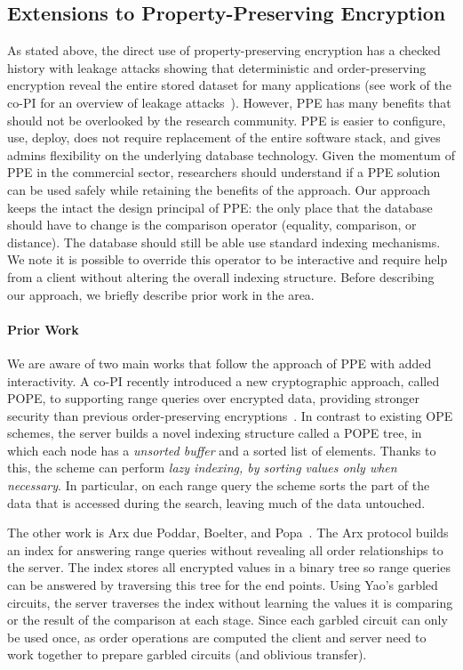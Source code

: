 
\subsection{Extensions to Property-Preserving Encryption}
As stated above, the direct use of property-preserving encryption has a checked history with leakage attacks showing that deterministic and order-preserving encryption reveal the entire stored dataset for many applications (see work of the co-PI for an overview of leakage attacks~\cite{SP:FVYSHG17}).  However, PPE has many benefits that should not be overlooked by the research community.  PPE is easier to configure, use, deploy, does not require replacement of the entire software stack, and gives admins flexibility on the underlying database technology.  Given the momentum of PPE in the commercial sector, researchers should understand if a PPE solution can be used safely while retaining the benefits of the approach.  Our approach keeps the intact the design principal of PPE: the only place that the database should have to change is the comparison operator (equality, comparison, or distance).  The database should still be able use standard indexing mechanisms.  We note it is possible to override this operator to be interactive and require help from a client without altering the overall indexing structure.  Before describing our approach, we briefly describe prior work in the area.

\paragraph{Prior Work}
We are aware of two main works that follow the approach of PPE with added interactivity.  A co-PI recently introduced a new cryptographic approach, called POPE, to
supporting range queries over encrypted data, providing stronger security than
previous order-preserving encryptions~\cite{CCS:RACY16}.  In contrast to
existing OPE schemes, the server builds a novel indexing structure called a
POPE tree, in which each node has a {\it unsorted buffer} and a sorted list of
elements.  Thanks to this, the scheme can perform {\it lazy indexing, by
sorting values only when necessary}. In particular, on each range query the
scheme sorts the part of the data that is accessed during the search, leaving
much of the data untouched.

The other work is Arx due Poddar, Boelter, and Popa~\cite{EPRINT:PodBoePop16}.  The
Arx protocol builds an index for answering
range queries without revealing all order relationships to the
server. The index stores all encrypted values in a binary
tree so range queries can be answered by traversing this
tree for the end points. Using Yao's garbled circuits, the
server traverses the index without learning the values it is
comparing or the result of the comparison at each stage.  Since each garbled circuit can only be used once, as order operations are computed the client and server need to work together to prepare garbled circuits (and oblivious transfer).

